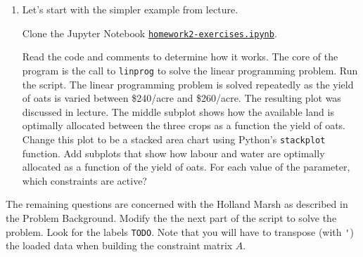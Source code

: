 \documentclass[letter]{article}
\begin{document}
\begin{enumerate}[label=\textbf{\arabic*.}]
	\item Let's start with the simpler example from lecture. 

	Clone the Jupyter Notebook \href{https://utoronto.syzygy.ca/jupyter/user-redirect/git-pull?repo=https://github.com/bigfatbernie/IBLMathModeling&subPath=homeworks/homework2/homework2-exercises.ipynb}{\tt homework2-exercises.ipynb}.
	
	Read the code and comments to determine how it works. The core of the program is the call to \verb|linprog| to solve the linear programming problem. Run the script. The linear programming problem is solved repeatedly as the yield of oats is varied between \$240/acre and \$260/acre. The resulting plot was discussed in lecture. The middle subplot shows how the available land is optimally allocated between the three crops as a function the yield of oats. Change this plot to be a stacked area chart using Python's \verb|stackplot| function. Add subplots that show how labour and water are optimally allocated as a function of the yield of oats. For each value of the parameter, which constraints are active? 
\end{enumerate}

The remaining questions are concerned with the Holland Marsh as described in the Problem Background. 
	Modify the the next part of the script to solve the problem. Look for the labels \verb|TODO|. 
	Note that you will have to transpose (with \verb|'|) the loaded data when building the constraint matrix $A$.
\end{document}
